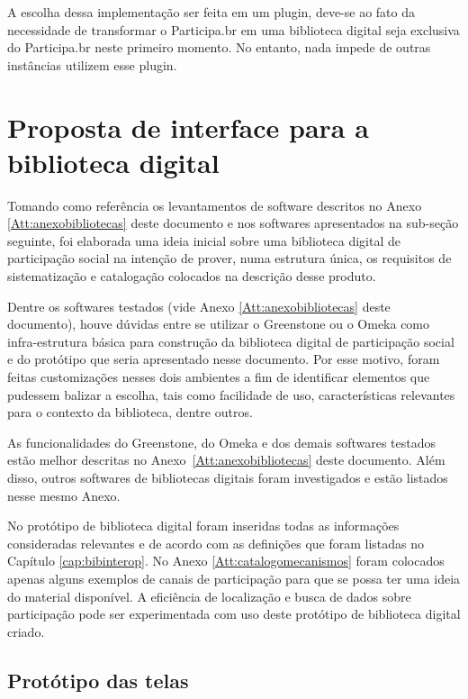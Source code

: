 A escolha dessa implementação ser feita em um plugin, deve-se ao fato da necessidade de transformar o Participa.br em uma biblioteca digital seja exclusiva do Participa.br neste primeiro momento. No entanto, nada impede de outras instâncias utilizem esse plugin.

\section{Proposta de interface para a biblioteca digital}
\label{sub:prototipo_biblioteca}

Tomando como referência os levantamentos de software descritos no Anexo \ref{Att:anexobibliotecas} deste documento e nos softwares apresentados na sub-seção seguinte, foi elaborada uma ideia inicial sobre uma biblioteca digital de participação social na intenção de prover, numa estrutura única, os requisitos de sistematização e catalogação colocados na descrição desse produto.
 
Dentre os softwares testados (vide Anexo \ref{Att:anexobibliotecas} deste documento), houve dúvidas entre se utilizar o Greenstone ou o Omeka como infra-estrutura básica para construção da biblioteca digital de participação social e do protótipo que seria apresentado nesse documento. Por esse motivo, foram feitas customizações nesses dois ambientes a fim de identificar elementos que pudessem balizar a escolha, tais como facilidade de uso, características relevantes para o contexto da biblioteca, dentre outros.

As funcionalidades do Greenstone, do Omeka e dos demais softwares testados estão melhor descritas no Anexo~\ref{Att:anexobibliotecas} deste documento. Além disso, outros softwares de bibliotecas digitais foram investigados e estão listados nesse mesmo Anexo.

No protótipo de biblioteca digital foram inseridas todas as informações consideradas relevantes e de acordo com as definições que foram listadas no Capítulo \ref{cap:bibinterop}. No Anexo \ref{Att:catalogomecanismos} foram colocados apenas alguns exemplos de canais de participação para que se possa ter uma ideia do material disponível. A eficiência de localização e busca de dados sobre participação pode ser experimentada com uso deste protótipo de biblioteca digital criado. 

\subsection*{Protótipo das telas}

